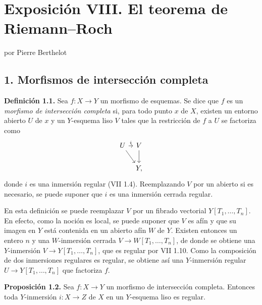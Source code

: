 
\section*{Exposición VIII. El teorema de Riemann--Roch}
\begin{center}
por Pierre Berthelot
\end{center}

\subsection*{1. Morfismos de intersección completa}

\textbf{Definición 1.1.} Sea $f:X\to Y$ un morfismo de esquemas. Se dice que
$f$ es un \emph{morfismo de intersección completa} si, para todo punto $x$ de
$X$, existen un entorno abierto $U$ de $x$ y un $Y$-esquema liso $V$ tales
que la restricción de $f$ a $U$ se factoriza como
\[
\begin{tikzcd}[column sep=tiny]
U \arrow[r,"i"] \arrow[dr] & V \arrow[d]\\
& Y,
\end{tikzcd}
\]
donde $i$ es una inmersión regular (VII 1.4). Reemplazando $V$ por un abierto
si es necesario, se puede suponer que $i$ es una inmersión cerrada regular.

En esta definición se puede reemplazar $V$ por un fibrado vectorial
$Y[T_1,\ldots,T_n]$. En efecto, como la noción es local, se puede suponer que
$V$ es afín y que su imagen en $Y$ está contenida en un abierto afín $W$ de
$Y$. Existen entonces un entero $n$ y una $W$-inmersión cerrada
$V\longrightarrow W[T_1,\ldots,T_n]$, de donde se obtiene una $Y$-inmersión
$V\to Y[T_1,\ldots,T_n]$, que es regular por VII 1.10. Como la composición
de dos inmersiones regulares es regular, se obtiene así una $Y$-inmersión
regular $U\longrightarrow Y[T_1,\ldots,T_n]$ que factoriza $f$.

\textbf{Proposición 1.2.} Sea $f:X\to Y$ un morfismo de intersección
completa. Entonces toda $Y$-inmersión $i:X\to Z$ de $X$ en un $Y$-esquema
liso es regular.

